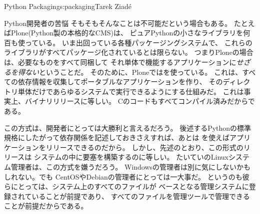 \begin{aosachapter}{Python Packaging}{s:packaging}{Tarek Ziad\'{e}}
\begin{aosasect1}{Python開発者の苦悩}
そもそもそんなことは不可能だという場合もある。
たとえばPlone(Python製の本格的なCMS)は、
ピュアPythonの小さなライブラリを何百も使っている。
いま出回っている各種パッケージングシステムで、
これらのライブラリがすべてパッケージ化されているとは限らない。
つまりPloneの場合は、必要なものをすべて同梱して
それ単体で機能するアプリケーションに\emph{せざるを得ない}ということだ。
そのために、Ploneではを使っている。
これは、すべての依存情報を収集してポータブルなアプリケーションを作り、
そのディレクトリ単体だけであらゆるシステムで実行できるようにする仕組みだ。
これは事実上、バイナリリリースに等しい。
Cのコードもすべてコンパイル済みだからである。

この方式は、開発者にとっては大勝利と言えるだろう。
後述するPythonの標準規格にしたがって依存関係を記述しておきさえすれば、あとは
を使えばアプリケーションをリリースできるのだから。
しかし、先述のとおり、この形式のリリースは
システムの中に要塞を構築するのに等しい。
たいていのLinuxシステム管理者は、この方式を嫌うだろう。
Windowsの管理者は別に気にしないかもしれない。でも
CentOSやDebianの管理者にとっては一大事だ。
というのも彼らにとっては、システム上のすべてのファイルが
ベースとなる管理システムに登録されていることが前提であり、
すべてのファイルを管理ツールで管理できることが前提だからである。


\end{aosasect1}
\end{aosachapter}
